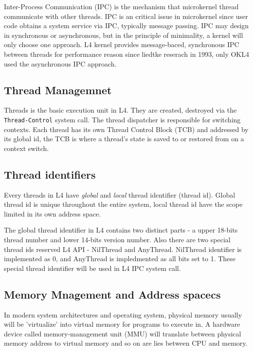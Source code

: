 \documentclass[10pt,preprint,nocopyrightspace]{sigplanconf}
\begin{document}
Inter-Process Communication (IPC) is the mechanism that microkernel thread communicate with other threads\cite{liedtke1993improving}. IPC is an critical issue in microkernel since user code obtains a system service via IPC, typically message passing. IPC may design in synchronous or asynchronous, but in the principle of minimality, a kernel will only choose one approach. L4 kernel provides message-baced, synchronous IPC between threads for performance reason since liedtke reserach in 1993\cite{liedtke1993improving}, only OKL4 used the asynchronous IPC approach\cite{elphinstone2013l3}.

\subsection{Thread Managemnet}

Threads is the basic execution unit in L4. They are created, destroyed via the \verb|Thread-Control| system call\cite{nourai2005aphysically}. The thread dispatcher is responsible for switching contexts. Each thread has its own Thread Control Block (TCB) and addressed by its global id, the TCB is where a thread's state is saved to or restored from on a context switch\cite{nourai2005aphysically}.

\subsection{Thread identifiers}

Every threads in L4 have \textit{global} and \textit{local} thread identifier (thread id). Global thread id is unique throughout the entire system, local thread id have the scope limited in its own address space.

The global thread identifier in L4 contains two distinct parts - a upper 18-bits thread number and lower 14-bits version number. Also there are two special thread ids reserved L4 API - NilThread and AnyThread. NilThread identifier is implemented as 0, and AnyThread is impledmented as all bits set to 1. These special thread identifier will be used in L4 IPC system call\cite{nourai2005aphysically}.

\subsection{Memory Mnagement and Address spacecs }

In modern system architectures and operating system, physical memory usually will be 'virtualize' into virtual memory for programs to execute in\cite{arpaci2015operating}. A hardware device called memory-management unit (MMU) will translate between physical memory address to virtual memory and so on are lies between CPU and memory.
\end{document}
